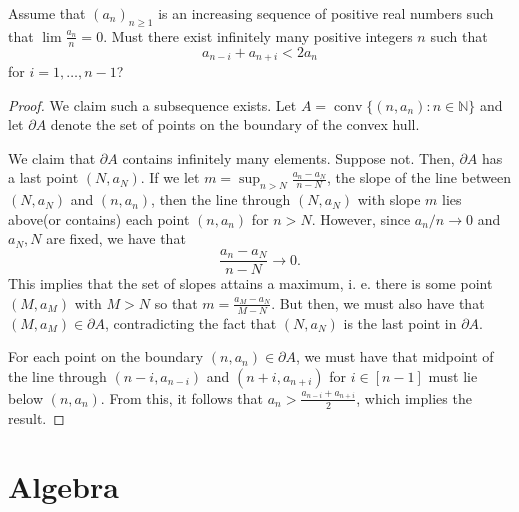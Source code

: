 \documentclass[11pt]{article}
\newcommand{\N}{\mathbb{N}}
\renewcommand{\>}{\rangle}
\newcommand{\<}{\langle}
\begin{document}
\begin{problem}[Putnam 2001 B6] Assume that $(a_n)_{n \ge 1}$ is an increasing sequence of positive real numbers such that $\lim \frac{a_n}{n} = 0$.  Must there exist infinitely many positive integers $n$ such that 
$$a_{n-i} + a_{n+i} < 2a_n$$
for $i = 1, \dots, n-1$?
\end{problem}
\begin{proof}
We claim such a subsequence exists.   Let $A = \operatorname{conv}\{(n, a_n) : n \in \N\}$ and let $\partial A$ denote the set of points on the boundary of the convex hull.  

We claim that $\partial A$ contains infinitely many elements.  Suppose not.  Then, $\partial A$ has a last point $(N, a_N)$.  If we let $m = \sup_{n > N} \frac{a_n - a_N}{n - N}$, the slope of the line between $(N, a_N)$ and $(n, a_n)$, then the line through $(N, a_N)$ with slope $m$ lies above(or contains) each point $(n, a_n)$ for $n > N$.  However, since $a_n/n \to 0$ and $a_N, N$ are fixed, we have that $$\frac{a_n - a_N}{n - N} \to 0.$$
This implies that the set of slopes attains a maximum, i. e. there is some point $(M, a_M)$ with $M > N$ so that $m = \frac{a_M - a_N}{M - N}$.  But then, we must also have that $(M, a_M) \in \partial A$, contradicting the fact that $(N, a_N)$ is the last point in $\partial A$.

For each point on the boundary $(n, a_n) \in \partial A$, we must have that midpoint of the line through $(n-i, a_{n-i})$ and $(n+i, a_{n+i})$ for $i \in [n-1]$ must lie below $(n, a_n)$.  From this, it follows that $a_n > \frac{a_{n-i} + a_{n+i}}{2}$, which implies the result.  
\end{proof}

\pagebreak
\section{Algebra}
\end{document}
